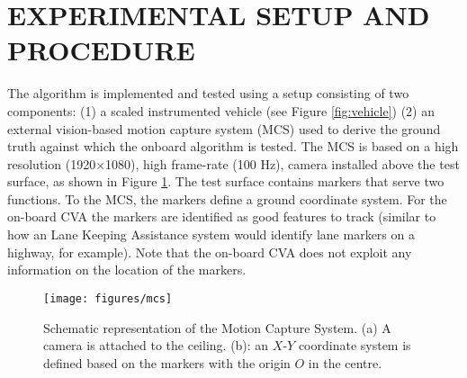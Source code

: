 \documentclass[letterpaper, 10 pt, conference]{ieeeconf}
\begin{document}
\section{EXPERIMENTAL SETUP AND PROCEDURE}\label{sec:experiment}

The algorithm is implemented and tested using a  setup consisting of two components: (1) a scaled instrumented vehicle (see Figure \ref{fig:vehicle}) (2) an external vision-based motion capture system (MCS) used to derive the ground truth against which the onboard algorithm is tested. The MCS is based on a high resolution (1920$\times$1080), high frame-rate (100 Hz),  camera installed above the test surface, as shown in Figure \ref{fig:mcs}. The test surface contains markers that serve two functions. To the MCS, the markers define a ground coordinate system. For the on-board CVA the markers are identified as good features to track (similar to how an Lane Keeping Assistance system would identify lane markers on a highway, for example). Note that the on-board CVA does not exploit any information on the location of the markers.
\begin{figure}[h]
\centering
{}
{\texttt{[image: figures/mcs]}}
\caption{Schematic representation of the  Motion Capture System. (a) A camera is attached to the ceiling. (b):  an $X$-$Y$ coordinate system is defined based on the markers with the origin $O$ in the centre.}
\label{fig:mcs}
\end{figure}
\end{document}
